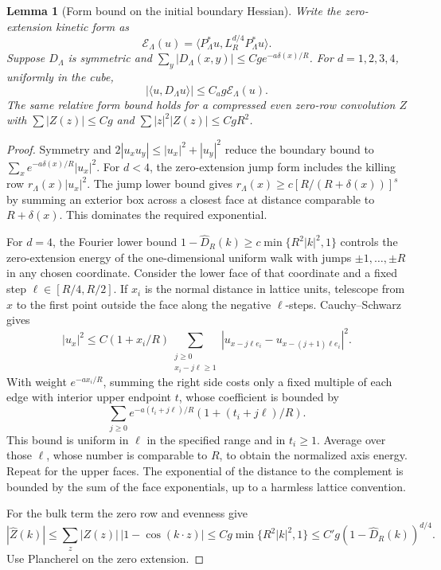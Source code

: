 \documentclass[11pt]{article}
\newtheorem{lemma}[theorem]{Lemma}
\theoremstyle{definition}
\begin{document}
\begin{lemma}[Form bound on the initial boundary Hessian]
\label{lem:boundary-form-extension}
Write the zero-extension kinetic form as
\begin{equation}
 \mathcal E_\Lambda(u)=
 \langle P_\Lambda^*u,L_R^{d/4}P_\Lambda^*u\rangle .
\end{equation}
Suppose \(D_\Lambda\) is symmetric and
\(\sum_y|D_\Lambda(x,y)|\le Cg e^{-a\delta(x)/R}\).
For \(d=1,2,3,4\), uniformly in the cube,
\begin{equation}
 |\langle u,D_\Lambda u\rangle|\le C_a g\mathcal E_\Lambda(u).
\end{equation}
The same relative form bound holds for a compressed even
zero-row convolution \(Z\) with
\(\sum |Z(z)|\le Cg\) and \(\sum|z|^2|Z(z)|\le CgR^2\).
\end{lemma}

\begin{proof}
Symmetry and \(2|u_xu_y|\le |u_x|^2+|u_y|^2\) reduce the
boundary bound to \(\sum_xe^{-a\delta(x)/R}|u_x|^2\).
For \(d<4\), the zero-extension jump form includes the killing
row \(r_\Lambda(x)|u_x|^2\). The jump lower bound gives
\(r_\Lambda(x)\ge c[R/(R+\delta(x))]^s\) by summing an exterior
box across a closest face at distance comparable to
\(R+\delta(x)\). This dominates the required exponential.

For \(d=4\), the Fourier lower bound
\(1-\widehat D_R(k)\ge c\min\{R^2|k|^2,1\}\)
controls the zero-extension energy of the one-dimensional
uniform walk with jumps \(\pm1,\ldots,\pm R\) in any chosen
coordinate. Consider the lower face of that coordinate and
a fixed step \(\ell\in[R/4,R/2]\). If \(x_i\) is the normal
distance in lattice units, telescope from \(x\) to the first
point outside the face along the negative \(\ell\)-steps.
Cauchy--Schwarz gives
\begin{equation}
 |u_x|^2\le C(1+x_i/R)
 \sum_{\substack{j\ge0\\x_i-j\ell\ge 1}}
        |u_{x-j\ell e_i}-u_{x-(j+1)\ell e_i}|^2 .
\end{equation}
With weight \(e^{-a x_i/R}\), summing the right side costs
only a fixed multiple of each edge with interior upper
endpoint \(t\), whose coefficient is bounded by
\begin{equation}
 \sum_{j\ge0}e^{-a(t_i+j\ell)/R}(1+(t_i+j\ell)/R).
\end{equation}
This bound is uniform in \(\ell\) in the specified range
and in \(t_i\ge1\). Average over those \(\ell\), whose
number is comparable to \(R\), to obtain the normalized
axis energy. Repeat for the upper faces. The exponential
of the distance to the complement is bounded by the sum
of the face exponentials, up to a harmless lattice convention.

For the bulk term the zero row and evenness give
\begin{equation}
 |\widehat Z(k)|
 \le \sum_z|Z(z)|\,|1-\cos(k\cdot z)|
 \le Cg\min\{R^2|k|^2,1\}
 \le C'g(1-\widehat D_R(k))^{d/4}.
\end{equation}
Use Plancherel on the zero extension.
\end{proof}
\end{document}
